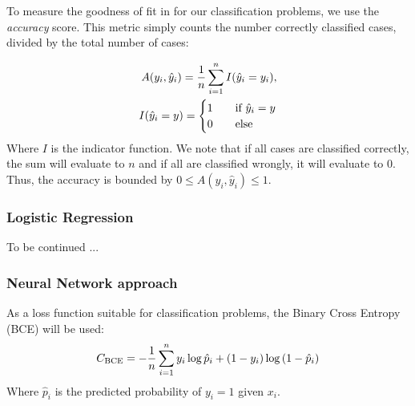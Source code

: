     To measure the goodness of fit in for our classification problems, we use the \textit{accuracy} score. This metric simply counts the number correctly classified cases, divided by the total number of cases:

    \begin{align}
        A(y_i, \hat{y}_i) = \frac{1}{n}\sum_{i=1}^{n} I(\hat{y}_i = y_i), \\
        I(\hat{y}_i = y) = \begin{cases}
            1\hspace{10px}&\text{if }\hat{y}_i = y \\
            0\hspace{10px}&\text{else}
        \end{cases} \nonumber
    \end{align}
    Where $I$ is the indicator function. We note that if all cases are classified correctly, the sum will evaluate to $n$ and if all are classified wrongly, it will evaluate to 0. Thus, the accuracy is bounded by $0 \leq A(y_i, \hat{y}_i) \leq 1$.

    \subsubsection*{Logistic Regression}
    To be continued ...

    \subsubsection*{Neural Network approach}
    As a loss function suitable for classification problems, the Binary Cross Entropy (BCE) \cite{BCE} will be used:
    \begin{align}
        {C}_\text{BCE} = -\frac{1}{n}\sum_{i=1}^{n} y_i \log{\hat{p}_i} + (1-y_i) \log{(1-\hat{p}_i)}
        \label{eq:BCE_loss_function}
    \end{align} 
    Where $\hat{p}_i$ is the predicted probability of $y_i = 1$ given $x_i$.  